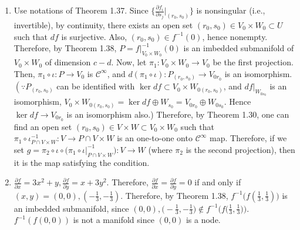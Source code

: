 \begin{enumerate}
(b) Let $(\tilde{A}, \iota^{\prime})$ be $A$ equipped with a manifold structure possibly different from the induced structure form $M$. 
Then $\operatorname{id}_{A}\colon \tilde{A} \rightarrow A$ is continuous and hence $\mathcal{C}^{\infty}$ by Theorem 1.32. 
Also it is nonsingular since $d \iota^{\prime}=d(\iota \circ \operatorname{id}_{A})$ is. 
Therefore, by Exercise 6, it is a diffeomorphism, which means that a manifold structure on $\tilde{A}$ is equal to that on $A$.
\item Use notations of Theorem 1.37. Since $\Big\{\frac{\partial f_{i}}{\partial s_{j}}\Big|_{\left(r_{0}, s_{0}\right)}\Big\}$ is nonsingular (i.e., invertible), 
by continuity, there exists an open set $(r_{0}, s_{0}) \in V_{0} \times W_{0} \subset U$ such that $d f$ is surjective. 
Also, $(r_{0}, s_{0}) \in f^{-1}(0)$, hence nonempty. 
Therefore, by Theorem 1.38, $P=f|_{V_{0} \times W_{0}}^{-1}(0)$ is an imbedded submanifold of $V_{0} \times W_{0}$ of dimension $c-d$. 
Now, let $\pi_{1}\colon V_{0} \times W_{0} \rightarrow V_{0}$ be the first projection. 
Then, $\pi_{1} \circ \iota\colon P \rightarrow V_{0}$ is $\mathcal{C}^{\infty}$, 
and $d(\pi_{1} \circ \iota)\colon P_{\left(r_{0}, s_{0}\right)} \rightarrow V_{0 r_{0}}$ is an isomorphism. 
$\left(\because P_{(r_{0}, s_{0})}\right.$ can be identified with $\ker d f \subset V_{0} \times W_{0(r_{0}, s_{0})}$, and $\left.d f\right|_{W_{0 s_{0}}}$ is an isomorphism, 
$V_{0} \times W_{0(r_{0}, s_{0})}=\ker d f \oplus W_{s_{0}}=V_{0 r_{0}} \oplus W_{0 s_{0}}$. 
Hence $\ker df \rightarrow V_{0 r_{0}}$ is an isomorphism also.) 
Therefore, by Theorem 1.30, one can find an open set $(r_{0}, s_{0}) \in V \times W \subset V_{0} \times W_{0}$ such that $\pi_{1} \circ \iota_{P \cap V \times W}^{-1}\colon V \rightarrow P \cap V \times W$ is an one-to-one onto $\mathcal{C}^{\infty}$ map. 
Therefore, if we set $g=\pi_{2} \circ \iota \circ\big(\pi_{1} \circ \iota|_{P \cap V \times W}^{-1}\big)\colon V \rightarrow W$ (where $\pi_{2}$ is the second projection), then it is the map satisfying the condition.
\item $\frac{\partial f}{\partial x}=3 x^{2}+y, \frac{\partial f}{\partial y}=x+3 y^{2}$. 
Therefore, $\frac{\partial f}{\partial x}=\frac{\partial f}{\partial y}=0$ if and only if $(x, y)=(0,0),\left(-\frac{1}{3},-\frac{1}{3}\right)$. 
Therefore, by Theorem 1.38, $f^{-1}\big(f\left(\frac{1}{3}, \frac{1}{3}\right)\big)$ is an imbedded submanifold, 
since $(0,0),\big(-\frac{1}{3},-\frac{1}{3}\big) \notin f^{-1}\big(f\big(\frac{1}{3}, \frac{1}{3}\big)\big)$. 
$f^{-1}(f(0,0))$ is not a manifold since $(0,0)$ is a node. 

\end{enumerate}
